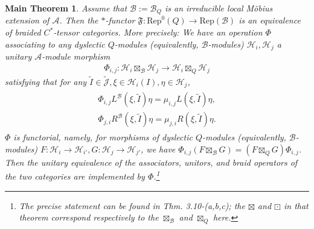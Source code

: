 \documentclass[12pt,a4paper,notitlepage]{article}
\theoremstyle{definition}
\theoremstyle{plain}
\newtheorem{Mthm}{Main Theorem}
\newcommand{\fk}{\mathfrak}
\newcommand{\mc}{\mathcal}
\newcommand{\wtd}{\widetilde}
\newcommand{\Rep}{\mathrm{Rep}}
\newcommand{\Jtd}{\widetilde{\mathcal J}}
\numberwithin{equation}{section}
\begin{document}
\begin{Mthm}\label{lb24}
Assume that $\mc B:=\mc B_Q$ is an irreducible local M\"obius extension of $\mc A$. Then the $*$-functor $\fk F:\Rep^0(Q)\rightarrow\Rep(\mc B)$ is an equivalence of braided $C^*$-tensor categories. More precisely: We have an operation $\Phi$ associating to any dyslectic $Q$-modules (equivalently, $\mc B$-modules) $\mc H_i,\mc H_j$ a unitary $\mc A$-module morphism
\begin{align}
\Phi_{i,j}:	\mc H_i\boxtimes_{\mc B}\mc H_j\rightarrow\mc H_i\boxtimes_Q\mc H_j
\end{align}
satisfying that for any $\wtd I\in\Jtd,\xi\in\mc H_i(I),\eta\in\mc H_j$,
\begin{gather}
\begin{gathered}
\Phi_{i,j}L^{\mc B}(\xi,\wtd I)\eta=\mu_{i,j}L(\xi,\wtd I)\eta,\\
\Phi_{j,i}R^{\mc B}(\xi,\wtd I)\eta=\mu_{j,i}R(\xi,\wtd I)\eta.
\end{gathered}	
\end{gather}
$\Phi$ is functorial, namely, for morphisms of dyslectic $Q$-modules (equivalently, $\mc B$-modules) $F:\mc H_i\rightarrow\mc H_{i'},G:\mc H_j\rightarrow\mc H_{j'}$, we have $\Phi_{i,j}(F\boxtimes_{\mc B}G)=(F\boxtimes_QG)\Phi_{i,j}$. Then  the unitary equivalence of the associators, unitors, and braid operators of the two categories are implemented by $\Phi$.\footnote{The precise statement can be found in \cite{Gui21a} Thm. 3.10-(a,b,c); the $\boxtimes$ and $\boxdot$ in that theorem correspond respectively to the $\boxtimes_{\mc B}$ and $\boxtimes_Q$ here.}
\end{Mthm}
\end{document}
